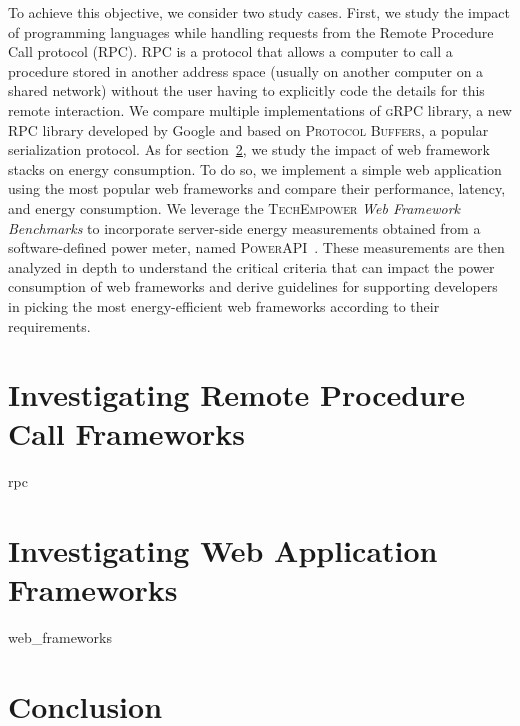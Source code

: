 To achieve this objective, we consider two study cases.
First, we study the impact of programming languages while handling requests from the Remote Procedure Call protocol (RPC).
RPC is a protocol that allows a computer to call a procedure stored in another address space (usually on another computer on a shared network) without the user having to explicitly code the details for this remote interaction.
We compare multiple implementations of \textsc{gRPC} library, a new RPC library developed by Google and based on \textsc{Protocol Buffers}, a popular serialization protocol.
As for section~\ref{sec:webframework}, we study the impact of web framework stacks on energy consumption. To do so, we implement a simple web application using the most popular web frameworks and compare their performance, latency, and energy consumption.  We leverage the \textsc{TechEmpower} \emph{Web Framework Benchmarks} to incorporate server-side energy measurements obtained from a software-defined power meter, named \textsc{PowerAPI}~\cite{fieni2020smartwatts}.
These measurements are then analyzed in depth to understand the critical criteria that can impact the power consumption of web frameworks and derive guidelines for supporting developers in picking the most energy-efficient web frameworks according to their requirements.



\section{Investigating Remote Procedure Call Frameworks}
{rpc}


\section{Investigating Web Application Frameworks}\label{sec:webframework}
{web_frameworks}

\section{Conclusion }
